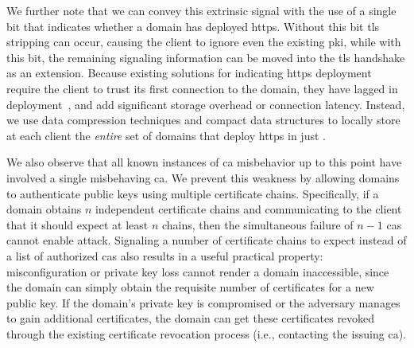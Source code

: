 We further note that we can convey this extrinsic signal with the use of a
single bit that indicates whether a domain has deployed \ac{https}. Without this
bit \ac{tls} stripping can occur, causing the client to ignore even the existing
\ac{pki}, while with this bit, the remaining signaling information can be moved
into the \ac{tls} handshake as an extension. Because existing solutions for
indicating \ac{https} deployment require the client to trust its first
connection to the domain, they have lagged in deployment~\cite{rfc4033,
rfc6698}, and add significant storage
overhead or connection
latency. Instead, we
use data compression techniques and compact data structures to locally store at
each client the \emph{entire} set of domains that deploy \ac{https} in just
.

We also observe that all known instances of \ac{ca} misbehavior up to this point
have involved a single misbehaving \ac{ca}. We prevent this weakness by allowing
domains to authenticate public keys using multiple certificate chains.
Specifically, if a domain obtains $n$ independent certificate chains and
communicating to the client that it should expect at least $n$ chains, then the
simultaneous failure of $n-1$ \acp{ca} cannot enable  attack.
Signaling a number of certificate chains to expect instead of a list of
authorized \acp{ca} also results in a useful practical property:
misconfiguration or private key loss cannot render a domain inaccessible, since
the domain can simply obtain the requisite number of certificates for a new
public key. If the domain's private key is compromised or the adversary manages
to gain additional certificates, the domain can get these certificates revoked
through the existing certificate revocation process (i.e., contacting the
issuing \ac{ca}).



